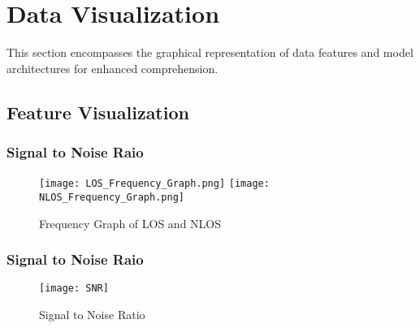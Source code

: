 \documentclass[
	article, %
	11pt, %
]{CSUniSchoolLabReport}
\begin{document}


\section{Data Visualization}\label{data_visualisation}

This section encompasses the graphical representation of data features and model architectures for enhanced comprehension.


\subsection{Feature Visualization}\label{feature_visualization}

\subsubsection{Signal to Noise Raio}\label{snr}

\begin{figure}[H] 
	\centering
	\texttt{[image: LOS\_Frequency\_Graph.png]}
	\texttt{[image: NLOS\_Frequency\_Graph.png]}
	\caption{Frequency Graph of LOS and NLOS}\label{fig:frequency_graph}
\end{figure}

\subsubsection{Signal to Noise Raio}\label{snr}

\begin{figure}[H] %
	\centering %
	\texttt{[image: SNR]} %
	\caption{Signal to Noise Ratio}\label{fig:snr}
\end{figure}
\end{document}
